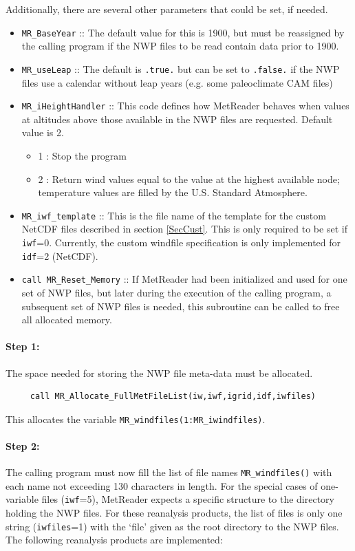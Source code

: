 \documentclass[11pt]{article}   %
\begin{document}
Additionally, there are several other parameters that could be set, if needed.
\begin{itemize}
\item \texttt{MR\_BaseYear} :: The default value for this is 1900, but must be
reassigned by the calling program if the NWP files to be read contain data prior to 1900.
\item \texttt{MR\_useLeap} :: The default is \texttt{.true.} but can be set to \texttt{.false.}
if the NWP files use a calendar without leap years (e.g. some paleoclimate CAM files)
\item \texttt{MR\_iHeightHandler} :: This code defines how MetReader behaves when values at
altitudes above those available in the NWP files are requested.  Default value is 2.
 \begin{itemize}
 \item   1 : Stop the program
 \item   2 : Return wind values equal to the value at the highest available node; temperature
values are filled by the U.S. Standard Atmosphere.
 \end{itemize}
\item \texttt{MR\_iwf\_template} :: This is the file name of the template for the
custom NetCDF files described in section \ref{SecCust}.  This is only required to be set
if \texttt{iwf}=0.  Currently, the custom windfile specification is only implemented for
\texttt{idf}=2 (NetCDF).
\item \texttt{call MR\_Reset\_Memory} :: If MetReader had been initialized and used for
one set of NWP files, but later during the execution of the calling program, a subsequent
set of NWP files is needed, this subroutine can be called to free all allocated memory.
\end{itemize}

\paragraph{Step 1:} The space needed for storing the NWP file meta-data must be allocated.
\begin{verbatim}
     call MR_Allocate_FullMetFileList(iw,iwf,igrid,idf,iwfiles)
\end{verbatim}
This allocates the variable \texttt{MR\_windfiles(1:MR\_iwindfiles)}.

\paragraph{Step 2:} The calling program must now fill the list of file names \texttt{MR\_windfiles()}
with each name not exceeding 130 characters in length.  For the special cases of one-variable files (\texttt{iwf}=5),
MetReader expects
a specific structure to the directory holding the NWP files.  For these reanalysis products,
the list of files is only one string (\texttt{iwfiles}=1)
with the `file' given as the root directory to the NWP files.  The following reanalysis products
are implemented:
\end{document}

